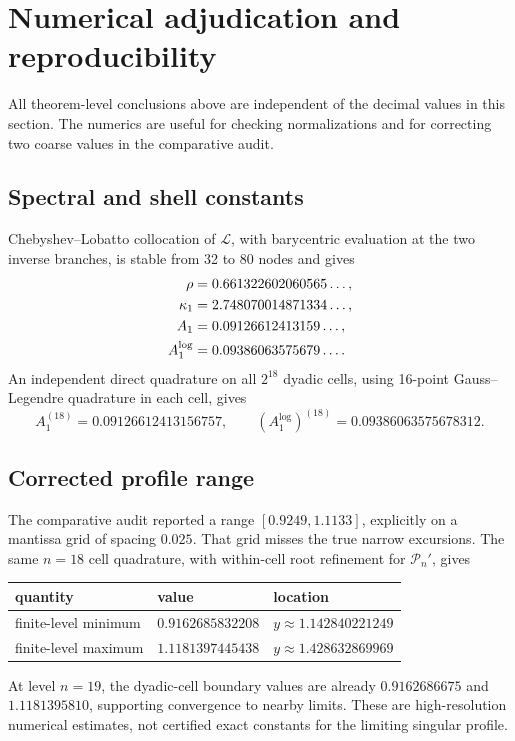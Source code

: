 \documentclass[11pt,oneside]{article}
\theoremstyle{definition}
\theoremstyle{remark}
\newcommand{\Lop}{\mathcal L}
\begin{document}
\section{Numerical adjudication and reproducibility}
\label{sec:numerics}

All theorem-level conclusions above are independent of the decimal values in
this section.  The numerics are useful for checking normalizations and for
correcting two coarse values in the comparative audit.

\subsection{Spectral and shell constants}

Chebyshev--Lobatto collocation of \(\Lop\), with barycentric evaluation at the
two inverse branches, is stable from 32 to 80 nodes and gives
\begin{align}
 \rho&=0.661322602060565\ldots,\notag\\
 \kappa_1&=2.748070014871334\ldots,\notag\\
 A_1&=0.09126612413159\ldots,\notag\\
 A_1^{\log}&=0.09386063575679\ldots .
 \label{eq:numeric-constants}
\end{align}
An independent direct quadrature on all \(2^{18}\) dyadic cells, using
16-point Gauss--Legendre quadrature in each cell, gives
\[
 A_1^{(18)}=0.09126612413156757,
 \qquad
 (A_1^{\log})^{(18)}=0.09386063575678312.
\]

\subsection{Corrected profile range}

The comparative audit reported a range \([0.9249,1.1133]\), explicitly on a
mantissa grid of spacing \(0.025\).  That grid misses the true narrow
excursions.  The same \(n=18\) cell quadrature, with within-cell root refinement
for \(\mathscr P_n'\), gives
\begin{center}
\begin{tabular}{@{}lll@{}}
\toprule
quantity & value & location\\
\midrule
finite-level minimum
 & \(0.9162685832208\)
 & \(y\approx1.142840221249\)\\
finite-level maximum
 & \(1.1181397445438\)
 & \(y\approx1.428632869969\)\\
\bottomrule
\end{tabular}
\end{center}
At level \(n=19\), the dyadic-cell boundary values are already
\(0.9162686675\) and \(1.1181395810\), supporting convergence to nearby
limits.  These are high-resolution numerical estimates, not certified exact
constants for the limiting singular profile.
\end{document}
